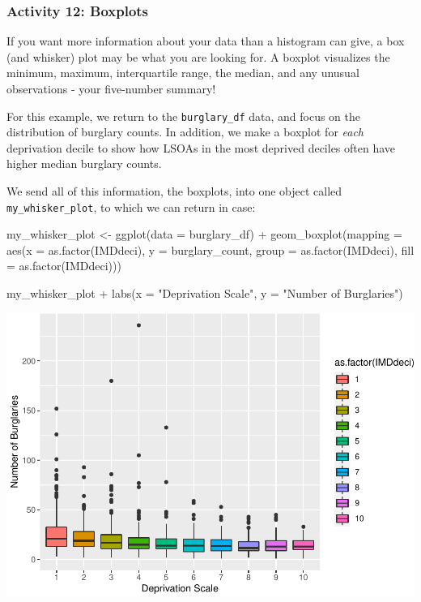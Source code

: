 \documentclass[
]{book}
\newenvironment{Shaded}{\begin{snugshade}}{\end{snugshade}}
\newcommand{\AttributeTok}[1]{\textcolor[rgb]{0.77,0.63,0.00}{#1}}
\newcommand{\FunctionTok}[1]{\textcolor[rgb]{0.00,0.00,0.00}{#1}}
\newcommand{\NormalTok}[1]{#1}
\newcommand{\OtherTok}[1]{\textcolor[rgb]{0.56,0.35,0.01}{#1}}
\newcommand{\SpecialCharTok}[1]{\textcolor[rgb]{0.00,0.00,0.00}{#1}}
\newcommand{\StringTok}[1]{\textcolor[rgb]{0.31,0.60,0.02}{#1}}
\begin{document}
\hypertarget{activity-12-boxplots}{%
\subsubsection{Activity 12: Boxplots}\label{activity-12-boxplots}}

If you want more information about your data than a histogram can give, a box (and whisker) plot may be what you are looking for. A boxplot visualizes the minimum, maximum, interquartile range, the median, and any unusual observations - your five-number summary!

For this example, we return to the \texttt{burglary\_df} data, and focus on the distribution of burglary counts. In addition, we make a boxplot for \emph{each} deprivation decile to show how LSOAs in the most deprived deciles often have higher median burglary counts.

We send all of this information, the boxplots, into one object called \texttt{my\_whisker\_plot}, to which we can return in case:

\begin{Shaded}
\begin{Highlighting}[]
\NormalTok{my\_whisker\_plot }\OtherTok{\textless{}{-}} \FunctionTok{ggplot}\NormalTok{(}\AttributeTok{data =}\NormalTok{ burglary\_df) }\SpecialCharTok{+} 
\FunctionTok{geom\_boxplot}\NormalTok{(}\AttributeTok{mapping =} \FunctionTok{aes}\NormalTok{(}\AttributeTok{x =} \FunctionTok{as.factor}\NormalTok{(IMDdeci), }\AttributeTok{y =}\NormalTok{ burglary\_count, }\AttributeTok{group =} \FunctionTok{as.factor}\NormalTok{(IMDdeci), }\AttributeTok{fill =} \FunctionTok{as.factor}\NormalTok{(IMDdeci))) }

\NormalTok{my\_whisker\_plot }\SpecialCharTok{+} 
  \FunctionTok{labs}\NormalTok{(}\AttributeTok{x =} \StringTok{"Deprivation Scale"}\NormalTok{, }\AttributeTok{y =} \StringTok{"Number of Burglaries"}\NormalTok{)}
\end{Highlighting}
\end{Shaded}

\includegraphics{03-data-visualisation_files/figure-latex/unnamed-chunk-21-1.pdf}
\end{document}
